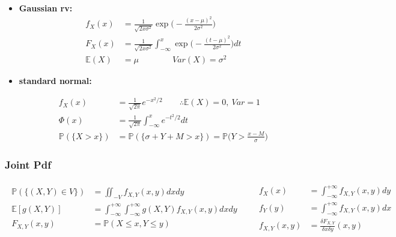 \documentclass[10pt]{article}
\begin{document}
\begin{multicols}{2}
\begin{itemize}
\item \textbf{Gaussian rv:}
  \begin{equation*}
    \boxed{
      \begin{aligned}
        f_X(x) &= \frac{1} {\sqrt{2x\sigma^2}}
        \exp{\Big(-\frac{(x-\mu)^2} {2\sigma^2}\Big)} \\
        F_X(x) &= \frac{1} {\sqrt{2x\sigma^2}} \int_{-\infty}^x
        \exp{\Big(-\frac{(t-\mu)^2}{2\sigma^2}\Big)} dt \\
        \mathbb{E}(X) &= \mu \qquad \qquad
        Var(X) = \sigma^2
      \end{aligned}
    }
  \end{equation*}

\item \textbf{standard normal:}

  \begin{equation*}
    \boxed{
      \begin{aligned}
        f_X(x) &= \frac{1}{\sqrt{2\pi}} e^{-x^2/2} \qquad 
        \therefore \mathbb{E}(X)=0, \ Var=1 \\
        \Phi(x) &= \frac{1}{\sqrt{2\pi}} \int_{-\infty}^x e^{-t^2/2} dt \\
        \mathbb{P}(\{X>x\}) &= \mathbb{P}(\{\sigma + Y + M > x\}) =
        \mathbb{P}\Big(Y>\frac{x-M}{\sigma}\Big)
      \end{aligned}
    }
  \end{equation*}
\end{itemize}
\end{multicols}

\subsubsection*{Joint Pdf}

\begin{equation*}
  \boxed{
    \begin{aligned}
      \begin{aligned}
        \mathbb{P}(\{(X,Y)\in V\}) &= \iint_{-V} f_{X,Y}(x,y) dx dy \\
        \mathbb{E}[g(X,Y)] &= \int_{-\infty}^{+\infty}
        \int_{-\infty}^{+\infty} g(X,Y) f_{X,Y}(x,y) dx dy \\
        F_{X,Y}(x,y) &= \mathbb{P}(X\leq x, Y\leq y)
      \end{aligned} \quad &
      \begin{aligned}
        f_X(x) &= \int_{-\infty}^{+\infty} f_{X,Y}(x,y) dy \\
        f_Y(y) &= \int_{-\infty}^{+\infty} f_{X,Y}(x,y) dx \\
        f_{X,Y}(x,y) &= \frac{\delta F_{X,Y}} {\delta x\delta y}(x,y)
      \end{aligned}
    \end{aligned}
  }
\end{equation*}
\end{document}
